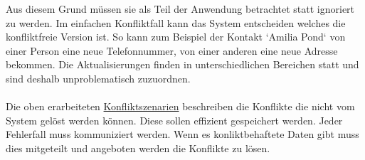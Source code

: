 Aus diesem Grund müssen sie als Teil der Anwendung betrachtet statt ignoriert zu werden.
Im einfachen Konfliktfall kann das System entscheiden welches die konfliktfreie Version ist.
So kann zum Beispiel der Kontakt `Amilia Pond` von einer Person eine neue Telefonnummer, von einer anderen eine neue Adresse bekommen.
Die Aktualisierungen finden in unterschiedlichen Bereichen statt und sind deshalb unproblematisch zuzuordnen.\\\\
Die oben erarbeiteten \hyperref[chap:konfliktszenarien]{Konfliktszenarien} beschreiben die Konflikte die nicht vom System gelöst werden können.
Diese sollen effizient gespeichert werden.
Jeder Fehlerfall muss kommuniziert werden. Wenn es konliktbehaftete Daten gibt muss dies mitgeteilt und angeboten werden die Konflikte zu lösen.
